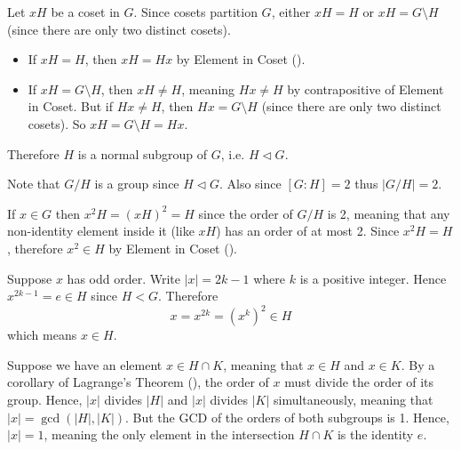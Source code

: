 \begin{questions}
    \item \begin{partquestions}{\roman*}
        \item Let $xH$ be a coset in $G$. Since cosets partition $G$, either $xH = H$ or $xH = G \setminus H$ (since there are only two distinct cosets).
        \begin{itemize}
                \item If $xH = H$, then $xH = Hx$ by Element in Coset ().
                \item If $xH = G \setminus H$, then $xH \neq H$, meaning $Hx \neq H$ by contrapositive of Element in Coset. But if $Hx \neq H$, then $Hx = G \setminus H$ (since there are only two distinct cosets). So $xH = G \setminus H = Hx$.
        \end{itemize}
        Therefore $H$ is a normal subgroup of $G$, i.e. $H \lhd G$.

        \item Note that $G/H$ is a group since $H \lhd G$. Also since $[G:H] = 2$ thus $|G/H| = 2$.

        If $x \in G$ then $x^2H = (xH)^2 = H$ since the order of $G/H$ is 2, meaning that any non-identity element inside it (like $xH$) has an order of at most 2. Since $x^2H = H$, therefore $x^2 \in H$ by Element in Coset ().

        \item Suppose $x$ has odd order. Write $|x| = 2k - 1$ where $k$ is a positive integer. Hence $x^{2k-1} = e \in H$ since $H < G$. Therefore
        \[
            x = x^{2k} = \left(x^k\right)^2 \in H
        \]
        which means $x \in H$.
    \end{partquestions}

    \item \begin{partquestions}{\alph*}
        \item Suppose we have an element $x \in H \cap K$, meaning that $x \in H$ and $x \in K$. By a corollary of Lagrange's Theorem (), the order of $x$ must divide the order of its group. Hence, $|x|$ divides $|H|$ and $|x|$ divides $|K|$ simultaneously, meaning that $|x| = \gcd(|H|, |K|)$. But the GCD of the orders of both subgroups is 1. Hence, $|x| = 1$, meaning the only element in the intersection $H \cap K$ is the identity $e$.


\end{partquestions}
\end{questions}
